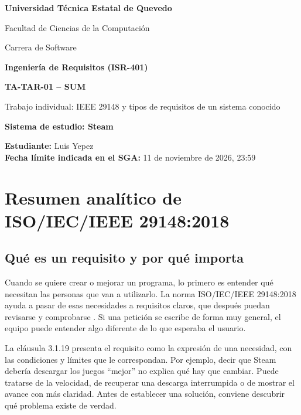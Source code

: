 \documentclass[12pt,a4paper]{article}
\begin{document}
\begin{titlepage}
\centering
{\Large\textbf{Universidad Técnica Estatal de Quevedo}}\par\vspace{0.3cm}
{\large Facultad de Ciencias de la Computación}\par
{\large Carrera de Software}\par\vspace{1.0cm}
{\large\textbf{Ingeniería de Requisitos (ISR-401)}}\par\vspace{1.5cm}
{\LARGE\textbf{TA-TAR-01 -- SUM}}\par\vspace{0.3cm}
{\Large Trabajo individual: IEEE 29148 y tipos de requisitos de un sistema conocido}\par\vspace{1.0cm}
{\Large\textbf{Sistema de estudio: Steam}}\par\vfill
\begin{flushleft}
\textbf{Estudiante:} Luis Yepez\\
\textbf{Fecha límite indicada en el SGA:} 11 de noviembre de 2026, 23:59
\end{flushleft}
\end{titlepage}

\section{Resumen analítico de ISO/IEC/IEEE 29148:2018}

\subsection*{Qué es un requisito y por qué importa}

Cuando se quiere crear o mejorar un programa, lo primero es entender qué necesitan las personas que van a utilizarlo. La norma ISO/IEC/IEEE 29148:2018 ayuda a pasar de esas necesidades a requisitos claros, que después puedan revisarse y comprobarse \cite{iso29148,pohl2025}. Si una petición se escribe de forma muy general, el equipo puede entender algo diferente de lo que esperaba el usuario.

La cláusula 3.1.19 presenta el requisito como la expresión de una necesidad, con las condiciones y límites que le correspondan. Por ejemplo, decir que Steam debería descargar los juegos ``mejor'' no explica qué hay que cambiar. Puede tratarse de la velocidad, de recuperar una descarga interrumpida o de mostrar el avance con más claridad. Antes de establecer una solución, conviene descubrir qué problema existe de verdad.
\end{document}

